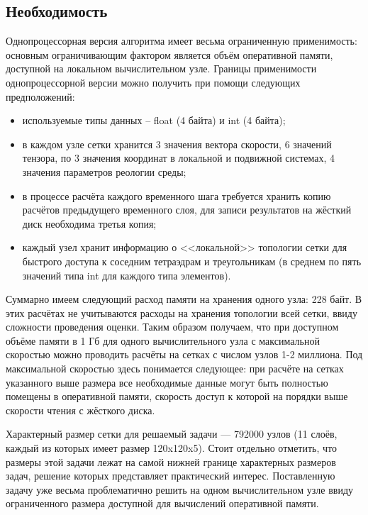 \subsection{Необходимость}
Однопроцессорная версия алгоритма имеет весьма ограниченную применимость: основным ограничивающим фактором является объём оперативной памяти, доступной на локальном вычислительном узле. Границы применимости однопроцессорной версии можно получить при помощи следующих предположений:
\begin{itemize}
	\item используемые типы данных -- float (4 байта) и int (4 байта);
	\item в каждом узле сетки хранится 3 значения вектора скорости, 6 значений тензора, по 3 значения координат в локальной и подвижной системах, 4 значения параметров реологии среды;
	\item в процессе расчёта каждого временного шага требуется хранить копию расчётов предыдущего временного слоя, для записи результатов на жёсткий диск необходима третья копия;
	\item каждый узел хранит информацию о <<локальной>> топологии сетки для быстрого доступа к соседним тетраэдрам и треугольникам (в среднем по пять значений типа int для каждого типа элементов).
\end{itemize}

Суммарно имеем следующий расход памяти на хранения одного узла: 228 байт. В этих расчётах не учитываются расходы на хранения топологии всей сетки, ввиду сложности проведения оценки. Таким образом получаем, что при доступном объёме памяти в 1 Гб для одного вычислительного узла с максимальной скоростью можно проводить расчёты на сетках с числом узлов 1-2 миллиона. Под максимальной скоростью здесь понимается следующее: при расчёте на сетках указанного выше размера все необходимые данные могут быть полностью помещены в оперативной памяти, скорость доступ к которой на порядки выше скорости чтения с жёсткого диска.

Характерный размер сетки для решаемый задачи —  792000 узлов (11 слоёв, каждый из которых имеет размер 120x120x5). Стоит отдельно отметить, что размеры этой задачи лежат на самой нижней границе характерных размеров задач, решение которых представляет практический интерес. Поставленную задачу уже весьма проблематично решить на одном вычислительном узле ввиду ограниченного размера доступной для вычислений оперативной памяти.

